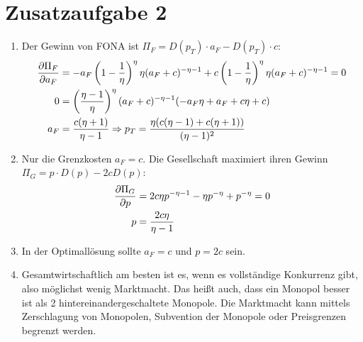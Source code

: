 \documentclass{article}
\begin{document}
	\section*{Zusatzaufgabe 2}
	\begin{enumerate}[label=(\alph*)]
		\item Der Gewinn von FONA ist $\Pi_F=D(p_T)\cdot a_F - D(p_T)\cdot c$:
		\begin{align}
			\frac{\partial \Pi_F}{\partial a_F} &= -a_F\left(1-\frac{1}{\eta}\right)^\eta\eta(a_F+c)^{-\eta-1} + c\left(1-\frac{1}{\eta}\right)^\eta\eta(a_F+c)^{-\eta-1} = 0 \notag \\
			0 &= \left(\frac{\eta-1}{\eta}\right)^\eta(a_F+c)^{-\eta-1}(-a_F\eta+a_F+c\eta+c) \notag \\
			a_F &= \frac{c(\eta+1)}{\eta-1} \Rightarrow p_T = \frac{\eta(c(\eta-1)+c(\eta+1))}{(\eta-1)^2} \notag
		\end{align}
		\item Nur die Grenzkosten $a_F=c$. Die Gesellschaft maximiert ihren Gewinn $\Pi_G=p\cdot D(p) - 2cD(p)$:
		\begin{align}
			\frac{\partial\Pi_G}{\partial p} &= 2c\eta p^{-\eta-1} - \eta p^{-\eta} + p^{-\eta} = 0 \notag \\
			p &= \frac{2c\eta}{\eta-1} \notag
		\end{align}
		\item In der Optimallösung sollte $a_F=c$ und $p=2c$ sein.
		\item Gesamtwirtschaftlich am besten ist es, wenn es vollständige Konkurrenz gibt, also möglichst wenig Marktmacht. Das heißt auch, dass ein Monopol besser ist als 2 hintereinandergeschaltete Monopole. Die Marktmacht kann mittels Zerschlagung von Monopolen, Subvention der Monopole oder Preisgrenzen begrenzt werden.
	\end{enumerate}
\end{document}
